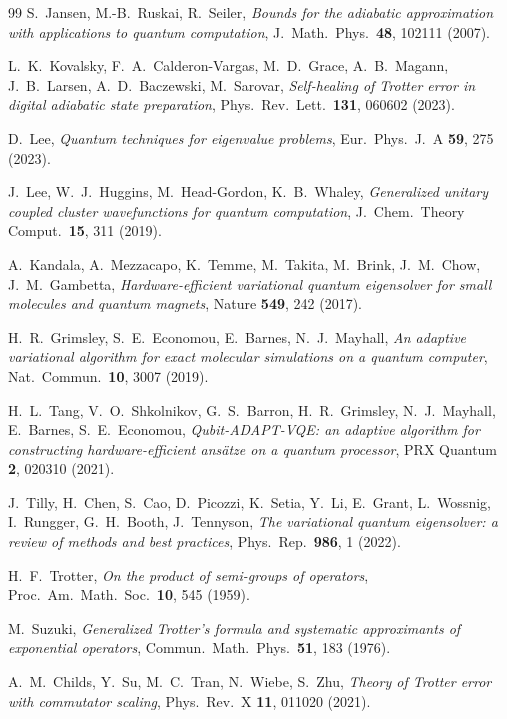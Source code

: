 \documentclass[
  aps,            %
  prc,            %
  reprint,        %
  superscriptaddress,
  floatfix,
  nofootinbib
]{revtex4-2}
\begin{document}
\begin{thebibliography}{99}
S.~Jansen, M.-B.~Ruskai, R.~Seiler,
\textit{Bounds for the adiabatic approximation with applications to quantum
computation},
J.\ Math.\ Phys.\ \textbf{48}, 102111 (2007).

L.~K.~Kovalsky, F.~A.~Calderon-Vargas, M.~D.~Grace, A.~B.~Magann,
J.~B.~Larsen, A.~D.~Baczewski, M.~Sarovar,
\textit{Self-healing of Trotter error in digital adiabatic state preparation},
Phys.\ Rev.\ Lett.\ \textbf{131}, 060602 (2023).

D.~Lee,
\textit{Quantum techniques for eigenvalue problems},
Eur.\ Phys.\ J.\ A \textbf{59}, 275 (2023).

J.~Lee, W.~J.~Huggins, M.~Head-Gordon, K.~B.~Whaley,
\textit{Generalized unitary coupled cluster wavefunctions for quantum computation},
J.\ Chem.\ Theory Comput.\ \textbf{15}, 311 (2019).

A.~Kandala, A.~Mezzacapo, K.~Temme, M.~Takita, M.~Brink, J.~M.~Chow,
J.~M.~Gambetta,
\textit{Hardware-efficient variational quantum eigensolver for small molecules
and quantum magnets},
Nature \textbf{549}, 242 (2017).

H.~R.~Grimsley, S.~E.~Economou, E.~Barnes, N.~J.~Mayhall,
\textit{An adaptive variational algorithm for exact molecular simulations on a
quantum computer},
Nat.\ Commun.\ \textbf{10}, 3007 (2019).

H.~L.~Tang, V.~O.~Shkolnikov, G.~S.~Barron, H.~R.~Grimsley, N.~J.~Mayhall,
E.~Barnes, S.~E.~Economou,
\textit{Qubit-ADAPT-VQE: an adaptive algorithm for constructing
hardware-efficient ans\"atze on a quantum processor},
PRX Quantum \textbf{2}, 020310 (2021).

J.~Tilly, H.~Chen, S.~Cao, D.~Picozzi, K.~Setia, Y.~Li, E.~Grant, L.~Wossnig,
I.~Rungger, G.~H.~Booth, J.~Tennyson,
\textit{The variational quantum eigensolver: a review of methods and best
practices},
Phys.\ Rep.\ \textbf{986}, 1 (2022).

H.~F.~Trotter,
\textit{On the product of semi-groups of operators},
Proc.\ Am.\ Math.\ Soc.\ \textbf{10}, 545 (1959).

M.~Suzuki,
\textit{Generalized Trotter's formula and systematic approximants of exponential
operators},
Commun.\ Math.\ Phys.\ \textbf{51}, 183 (1976).

A.~M.~Childs, Y.~Su, M.~C.~Tran, N.~Wiebe, S.~Zhu,
\textit{Theory of Trotter error with commutator scaling},
Phys.\ Rev.\ X \textbf{11}, 011020 (2021).


\end{thebibliography}
\end{document}
